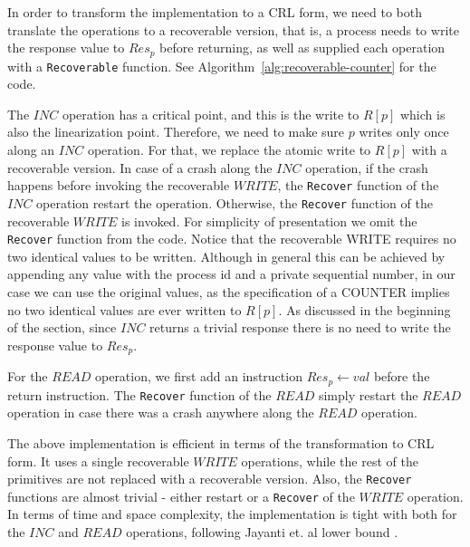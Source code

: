 In order to transform the implementation to a CRL form, we need to both translate the operations to a recoverable version, that is, a process needs to write the response value to $Res_p$ before returning, as well as supplied each operation with a \texttt{Recoverable} function. See Algorithm~\ref{alg:recoverable-counter} for the code.

The $INC$ operation has a critical point, and this is the write to $R[p]$ which is also the linearization point. Therefore, we need to make sure $p$ writes only once along an $INC$ operation. For that, we replace the atomic write to $R[p]$ with a recoverable version. In case of a crash along the $INC$ operation, if the crash happens before invoking the recoverable $WRITE$, the \texttt{Recover} function of the $INC$ operation restart the operation. Otherwise, the \texttt{Recover} function of the recoverable $WRITE$ is invoked. For simplicity of presentation we omit the \texttt{Recover} function from the code.
Notice that the recoverable WRITE requires no two identical values to be written. Although in general this can be achieved by appending any value with the process id and a private sequential number, in our case we can use the original values, as the specification of a COUNTER implies no two identical values are ever written to $R[p]$.
As discussed in the beginning of the section, since $INC$ returns a trivial response there is no need to write the response value to $Res_p$.

For the $READ$ operation, we first add an instruction $Res_p \gets val$ before the return instruction. The \texttt{Recover} function of the $READ$ simply restart the $READ$ operation in case there was a crash anywhere along the $READ$ operation.

The above implementation is efficient in terms of the transformation to CRL form. It uses a single recoverable $WRITE$ operations, while the rest of the primitives are not replaced with a recoverable version. Also, the \texttt{Recover} functions are almost trivial - either restart or a \texttt{Recover} of the $WRITE$ operation. In terms of time and space complexity, the implementation is tight with both for the $INC$ and $READ$ operations, following Jayanti et. al lower bound \cite{DBLP:journals/siamcomp/JayantiTT00}.